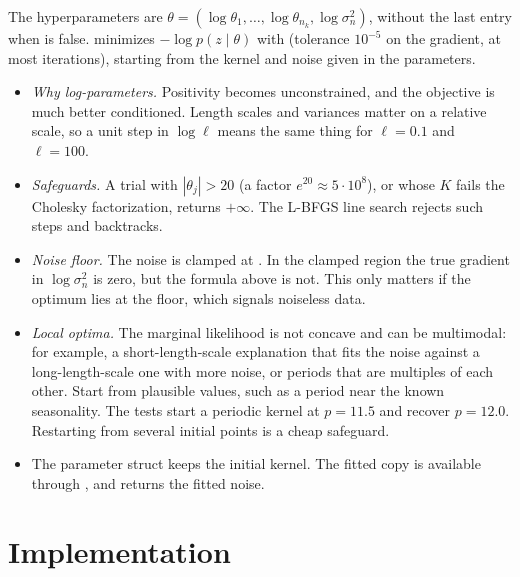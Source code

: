 \documentclass[11pt,a4paper]{article}
\begin{document}
The hyperparameters are
$\theta=(\log\theta_1,\dots,\log\theta_{n_k},\log\sigma_n^2)$, without the last entry when
 is false.  minimizes $-\log p(z\mid\theta)$ with
 (tolerance $10^{-5}$ on the gradient, at most 
iterations), starting from the kernel and noise given in the parameters.
\begin{itemize}
  \item \emph{Why log-parameters.} Positivity becomes unconstrained, and the
        objective is much better conditioned. Length scales and variances matter on a
        relative scale, so a unit step in $\log\ell$ means the same thing for $\ell=0.1$ and $\ell=100$.
  \item \emph{Safeguards.} A trial with $|\theta_j|>20$ (a factor $e^{20}\approx5\cdot10^8$), or
        whose $K$ fails the Cholesky factorization, returns $+\infty$. The L-BFGS line search
        rejects such steps and backtracks.
  \item \emph{Noise floor.} The noise is clamped at . In
        the clamped region the true gradient in $\log\sigma_n^2$ is zero, but the formula
        above is not. This only matters if the optimum lies at the floor, which
        signals noiseless data.
  \item \emph{Local optima.} The marginal likelihood is not concave and can be
        multimodal: for example, a short-length-scale explanation that fits the noise against a long-length-scale one with
        more noise, or periods that are multiples of each other. Start from plausible values,
        such as a period near the known seasonality. The  tests start a periodic kernel at
        $p=11.5$ and recover $p=12.0$. Restarting from several initial points is a cheap
        safeguard.
  \item The parameter struct keeps the initial kernel. The fitted copy is
        available through , and  returns the fitted noise.
\end{itemize}

\section{Implementation}
\end{document}
